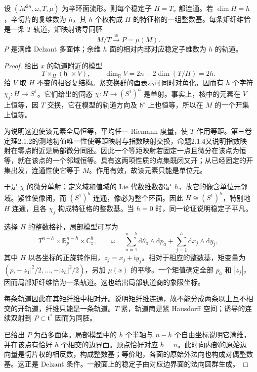 \begin{proposition}\label{g4:prop:1204:toric-orbits}
	设 \((M^{2n},\omega,T,\mu)\) 为辛环面流形。则每个稳定子 \(H=T_x\) 都连通。若 \(\dim H=h\)，辛切片的复维数为 \(h\)，其 \(h\) 个权构成 \(H\) 的特征格的一组整数基。每条矩纤维恰是一条 \(T\) 轨道，矩映射诱导同胚
	\[
		M/T\xrightarrow{\ \cong\ }P=\mu(M).
	\]
	\(P\) 是满维 Delzant 多面体；余维 \(h\) 面的相对内部对应稳定子维数为 \(h\) 的轨道。
\end{proposition}
\begin{proof}
	给出 \(x\) 的轨道附近的模型
	\[
		T\times_H(\mathfrak h^\circ\times V),\qquad
		\dim_{\mathbb R}V=2n-2\dim(T/H)=2h.
	\]
	给 \(V\) 取 \(H\) 不变的相容复结构。紧交换群的酉表示可同时对角化，因而有 \(h\) 个字符 \(\chi_j:H\to S^1\)。它们给出的同态 \(\chi:H\to(S^1)^h\) 是单射。事实上，核中的元素在 \(V\) 上恒等，因 \(T\) 交换，它在模型的轨道方向及 \(\mathfrak h^\circ\) 上也恒等，所以在 \(M\) 的一个开集上恒等。

	为说明这迫使该元素全局恒等，平均任一 Riemann 度量，使 \(T\) 作用等距。第三卷定理2.1.2的测地初值唯一性使等距映射与指数映射交换，命题2.1.4又说明指数映射在零点附近是局部微分同胚。因此一个等距映射若固定一点且微分在该点为恒等，就在该点的一个邻域恒等。具有这两项性质的点集既闭又开；从已经固定的开集出发，连通性使它等于 \(M\)。作用有效，故该元素只能是单位元。

	于是 \(\chi\) 的微分单射；定义域和值域的 Lie 代数维数都是 \(h\)，故它的像含单位元邻域。紧性使像闭，而 \((S^1)^h\) 连通，像必为整个环面。因此 \(H\cong(S^1)^h\)，特别地 \(H\) 连通，且各 \(\chi_j\) 构成特征格的整数基。当 \(h=0\) 时，同一论证说明稳定子平凡。

	选择 \(H\) 的整数格补，局部模型可写为
	\begin{equation}\label{g4:eq:1204:corner-model}
		T^{n-h}\times\mathbb R^{n-h}_p\times\mathbb C^h_z,
		\qquad
		\omega=\sum_{a=1}^{n-h}\mathrm{d}\theta_a\wedge\mathrm{d}p_a
		+\sum_{j=1}^h\mathrm{d}x_j\wedge\mathrm{d}y_j,
	\end{equation}
	其中 \(H\) 以各坐标的正旋转作用，\(z_j=x_j+\mathrm{i}y_j\)。相对于相应的整数基，矩变量为 \((p,-|z_1|^2/2,\ldots,-|z_h|^2/2)\)，另加 \(\mu(x)\) 的平移。一个矩值确定全部 \(p_a\) 和 \(|z_j|\)，因而局部矩纤维恰为一条轨道。这也给出局部轨道商的象限坐标。

	每条轨道因此在其矩纤维中相对开。说明矩纤维连通，故不能分成两条以上互不相交的开轨道，纤维只能是一条轨道。\(T\) 紧，轨道商是紧 Hausdorff 空间；诱导的连续双射到 \(P\subset\mathfrak t^*\) 因而为同胚。

	已给出 \(P\) 为凸多面体。局部模型中的 \(h\) 个半轴与 \(n-h\) 个自由坐标说明它满维，并在该点有恰好 \(h\) 个相交的边界面。顶点恰好对应 \(h=n\)。此时向内部的原始边向量是切片权的相反数，构成整数基；等价地，各面的原始外法向也构成对偶整数基。这正是 Delzant 条件。一般面上的稳定子由对应边界面的法向圆群生成。
\end{proof}

